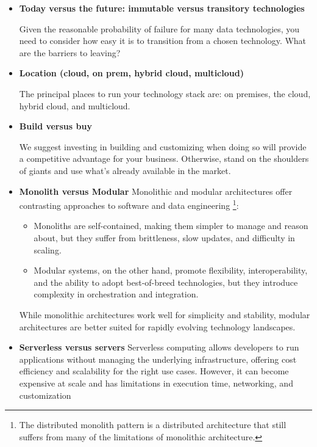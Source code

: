 \begin{itemize}
    \item \textbf{Today versus the future: immutable versus transitory technologies}
            
    \noindent
    Given the reasonable probability of failure for many data
    technologies, you need to consider how easy it is to
    transition from a chosen technology. What are the barriers
    to leaving?


    \item \textbf{Location (cloud, on prem, hybrid cloud, multicloud)}
    
    \noindent
    The principal places to run your technology stack are:
    on premises, the cloud, hybrid cloud, and multicloud.


    \item \textbf{Build versus buy}
    
    \noindent
    We suggest investing in building and customizing when doing
    so will provide a competitive advantage for your business.
    Otherwise, stand on the shoulders of giants and use what's
    already available in the market.


    \item \textbf{Monolith versus Modular}
    Monolithic and modular architectures offer contrasting approaches
    to software and data engineering
    \footnote{
        The distributed monolith pattern is a distributed
        architecture that still suffers from many of the
        limitations of monolithic architecture.
    }:
    \begin{itemize}
        \item Monoliths are self-contained, making them simpler to
        manage and reason about, but they suffer from brittleness,
        slow updates, and difficulty in scaling.

        \item Modular systems, on the other hand, promote flexibility,
        interoperability, and the ability to adopt best-of-breed
        technologies, but they introduce complexity in orchestration
        and integration.
    \end{itemize}
    While monolithic architectures work well for simplicity and stability,
    modular architectures are better suited for rapidly evolving
    technology landscapes.
    

    \item \textbf{Serverless versus servers}
    Serverless computing allows developers to run applications without
    managing the underlying infrastructure, offering cost efficiency and
    scalability for the right use cases. However, it can become expensive
    at scale and has limitations in execution time, networking, and
    customization
    

\end{itemize}
